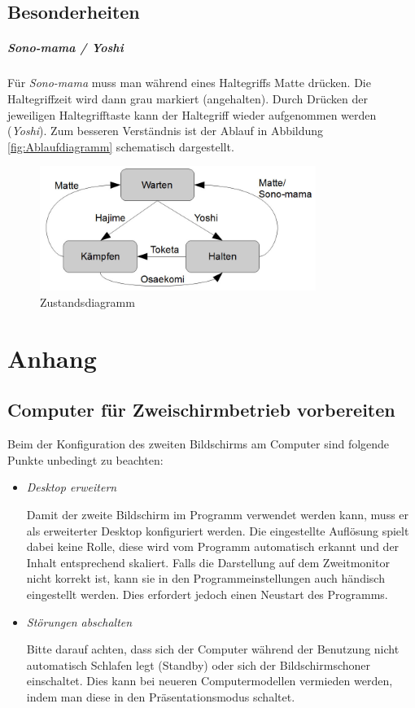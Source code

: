 ﻿\documentclass[11pt,numbers=noenddot]{scrreprt}
\begin{document}
\section[Besonderheiten]{Besonderheiten}
\paragraph{Sono-mama / Yoshi}
Für \emph{Sono-mama} muss man während eines Haltegriffs Matte drücken. Die Haltegriffzeit wird dann grau markiert (angehalten). Durch Drücken der jeweiligen Haltegrifftaste kann der Haltegriff wieder aufgenommen werden (\emph{Yoshi}). Zum besseren Verständnis ist der Ablauf in Abbildung \ref{fig:Ablaufdiagramm} schematisch dargestellt.
\begin{figure}[h]
	\centering
		\includegraphics[width=0.8\textwidth]{images/Ablaufdiagramm.jpg}
	\caption{Zustandsdiagramm}
	\label{fig:Zustandsdiagramm}
\end{figure}

\chapter{Anhang}
\section[Computer für Zweischirmbetrieb vorbereiten]{Computer für Zweischirmbetrieb vorbereiten}
\label{bkm:AnhangDualView}
Beim der Konfiguration des zweiten Bildschirms am Computer sind folgende Punkte unbedingt zu beachten:
\begin{itemize}
	\item \textit{Desktop erweitern}
	
	Damit der zweite Bildschirm im Programm verwendet werden kann, muss er als erweiterter Desktop konfiguriert werden. Die eingestellte Auflösung spielt dabei keine Rolle, diese wird vom Programm automatisch erkannt und der Inhalt entsprechend skaliert. Falls die Darstellung auf dem Zweitmonitor nicht korrekt ist, kann sie in den Programmeinstellungen auch händisch eingestellt werden. Dies erfordert jedoch einen Neustart des Programms.

	\item \textit{Störungen abschalten}
	
	Bitte darauf achten, dass sich der Computer während der Benutzung nicht automatisch Schlafen legt (Standby) oder sich der Bildschirmschoner einschaltet. Dies kann bei neueren Computermodellen vermieden werden, indem man diese in den Präsentationsmodus schaltet.
\end{itemize}
\end{document}
